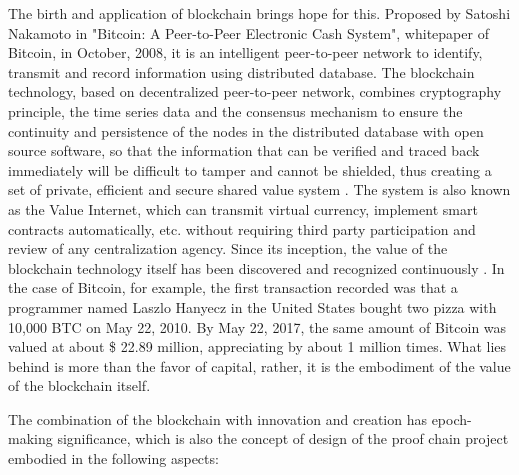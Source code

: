 \documentclass[a4paper,oneside,openany]{tufte-book}
\begin{document}
The birth and application of blockchain brings hope for this. Proposed by Satoshi Nakamoto in "Bitcoin: A Peer-to-Peer Electronic Cash System",       whitepaper of Bitcoin, in October, 2008, it is an intelligent peer-to-peer network to identify, transmit and record information using distributed database. The blockchain technology, based on decentralized peer-to-peer network, combines cryptography principle, the time series data and the consensus mechanism to ensure the continuity and persistence of the nodes in the distributed database with open source software, so that the information that can be verified and traced back immediately will be difficult to tamper and cannot be shielded, thus creating a set of private, efficient and secure shared value system .      The system is also known as the Value Internet, which can transmit virtual currency, implement smart contracts automatically, etc. without requiring third party participation and review of any centralization agency. Since its inception, the value of the blockchain technology itself has been discovered and recognized continuously         .         In the case of Bitcoin, for example, the first transaction recorded was that a programmer named Laszlo Hanyecz in the United States bought two pizza with 10,000 BTC on May 22, 2010. By May 22, 2017, the same amount of Bitcoin was valued at about \$ 22.89 million, appreciating by about 1 million times. What lies behind is more than the favor of capital, rather, it is the embodiment of the value of the blockchain itself.




The combination of the blockchain with innovation and creation has epoch-making significance, which is also the concept of design of the proof chain project embodied in the following aspects:
\end{document}
